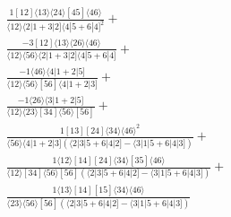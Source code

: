 \documentclass[varwidth, border=5pt]{standalone}
\begin{document}
\begin{my}
$\begin{gathered}
\scriptscriptstyle\frac{1[12]⟨13⟩⟨24⟩[45]⟨46⟩}{⟨12⟩⟨2|1+3|2]⟨4|5+6|4]^2}+\\
\scriptscriptstyle\frac{-3[12]⟨13⟩⟨26⟩⟨46⟩}{⟨12⟩⟨56⟩⟨2|1+3|2]⟨4|5+6|4]}+\\
\scriptscriptstyle\frac{-1⟨46⟩⟨4|1+2|5]}{⟨12⟩⟨56⟩[56]⟨4|1+2|3]}+\\
\scriptscriptstyle\frac{-1⟨26⟩⟨3|1+2|5]}{⟨12⟩⟨23⟩[34]⟨56⟩[56]}+\\
\scriptscriptstyle\frac{1[13][24]⟨34⟩⟨46⟩^2}{⟨56⟩⟨4|1+2|3](⟨2|3|5+6|4|2]-⟨3|1|5+6|4|3])}+\\
\scriptscriptstyle\frac{1⟨12⟩[14][24]⟨34⟩[35]⟨46⟩}{⟨12⟩[34]⟨56⟩[56](⟨2|3|5+6|4|2]-⟨3|1|5+6|4|3])}+\\
\scriptscriptstyle\frac{1⟨13⟩[14][15]⟨34⟩⟨46⟩}{⟨23⟩⟨56⟩[56](⟨2|3|5+6|4|2]-⟨3|1|5+6|4|3])}\phantom{+}
\end{gathered}$
\end{my}
\end{document}
